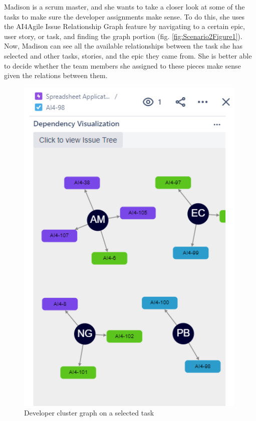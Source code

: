 Madison is a scrum master, and she wants to take a closer look at some of the tasks to make sure the developer assignments make sense. To do this, she uses the AI4Agile Issue Relationship Graph feature by navigating to a certain epic, user story, or task, and finding the graph portion (fig. \ref{fig:Scenario2Figure1}). Now, Madison can see all the available relationships between the task she has selected and other tasks, stories, and the epic they came from. She is better able to decide whether the team members she assigned to these pieces make sense given the relations between them.

\begin{figure}
\centerline{\includegraphics[width=\textwidth,height=\textheight,keepaspectratio]{./figure/Scenario2Figure2.png}}
\caption{Developer cluster graph on a selected task}
\label{fig:Scenario2Figure2}
\end{figure}

